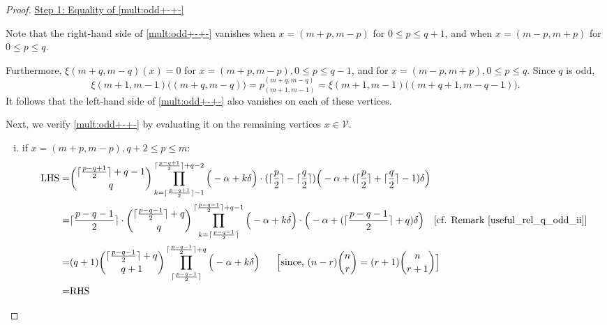 \documentclass[10pt, a4paper, reqno]{amsart}
\begin{document}
	\begin{proof}
	\underline{Step 1:	Equality of  \eqref{mult:odd+-+-}} 


Note that the right-hand side of \eqref{mult:odd+-+-}  vanishes when $x = (m+p, m-p)$ for $0 \leq p \leq q+1$, 
and when $x = (m-p, m+p)$ for $0 \leq p \leq q$. 

Furthermore, 	$\xi(m+q,m-q)(x)=0$ for $x = (m+p, m-p), 0 \leq p \leq q-1$, and  for $x = (m-p, m+p),0 \leq p \leq q$. Since $q$ is odd,
\[
\xi(m+1, m-1)\big((m+q, m-q)\big)
= p^{(m+q, m-q)}_{(m+1, m-1)}= \xi(m+1, m-1)\big((m+q+1, m-q-1)\big).
\]
It follows that the left-hand side of \eqref{mult:odd+-+-} also vanishes on each of these vertices. 

Next, we verify \eqref{mult:odd+-+-} by evaluating it on the remaining vertices $x \in \mathcal{V}$.

			\begin{enumerate}[(i)]
				\item if $x=(m+p,m-p), q+2\leq p\leq m$:
				\[\begin{split}
					\text{LHS}=&\binom{\lceil \frac{p-q+1}{2} \rceil + q-1}{\,q\,}\displaystyle\prod_{k=\lceil \frac{p-q+1}{2} \rceil -1}^{\lceil \frac{p-q+1}{2} \rceil +q-2}\Big(-\alpha +k\delta\Big)  \cdot    (\lceil \frac{p}{2}\rceil-\lceil \frac{q}{2}\rceil)    \Big(-\alpha +(\lceil \frac{p}{2}\rceil+\lceil \frac{q}{2}\rceil-1)\delta \Big)\\
					=& \displaystyle \lceil \frac{p-q-1}{2}\rceil \cdot\binom{\lceil \frac{p-q-1}{2} \rceil + q}{\,q\,}\prod_{k=\lceil \frac{p-q-1}{2} \rceil }^{\lceil \frac{p-q-1}{2} \rceil +q-1}\Big(-\alpha +k\delta\Big)  \cdot   \Big(-\alpha +(\lceil \frac{p-q-1}{2}\rceil+q)\delta \Big)  \text{ ~~[cf. Remark \ref{useful_rel_q_odd_ii}]} \\
					=&(q+1)	\binom{\lceil \frac{p-q-1}{2} \rceil + q}{\,q+1\,}\displaystyle\prod_{\lceil \frac{p-q-1}{2} \rceil}^{\lceil \frac{p-q-1}{2} \rceil +q}\Big(-\alpha +k\delta\Big)~~~~~ \text{\Big [since, $(n-r)\binom{n}{r}=(r+1)\binom{n}{r+1}$\Big]}\\
				=&\text{RHS}
				\end{split}\]
				

\end{enumerate}
\end{proof}
\end{document}
